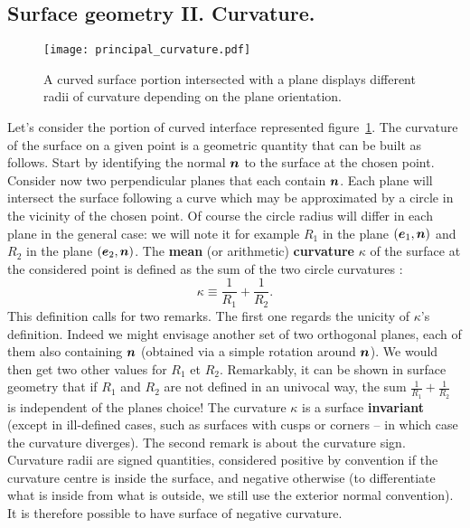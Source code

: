 \subsection{Surface geometry II. Curvature.}
\begin{figure}[htbp]
\begin{center}
\texttt{[image: principal\_curvature.pdf]} 
\end{center}
\caption{A curved surface portion intersected with a plane displays different radii of curvature depending on the plane orientation.}
\label{fig:principal_curvature}
\end{figure}
Let's consider the portion of curved interface represented figure~\ref{fig:principal_curvature}. The curvature of the surface on a given point is a geometric quantity that can be built as follows. Start by identifying the normal $\bn$ to the surface at the chosen point. Consider now two perpendicular planes that each contain $\bn$. Each plane will intersect the surface following a curve which may be approximated by a circle in the vicinity of the chosen point. Of course the circle radius will differ in each plane in the general case: we will note it for example $R_1$ in the plane $\lp\be_1,\bn\rp$ and $R_2$ in the plane $\lp\be_2,\bn\rp$. The \textbf{mean} (or arithmetic) \textbf{curvature} $\kappa$ of the surface at the considered point is defined as the sum of the two circle curvatures :
\begin{equation}
\kappa \equiv \frac{1}{R_1} + \frac{1}{R_2}.
\end{equation}
This definition calls for two remarks. The first one regards the unicity of $\kappa$'s definition. Indeed we might envisage another set of two orthogonal planes, each of them also containing $\bn$ (obtained via a simple rotation around $\bn$). We would then get two other values for $R_1$ et $R_2$. Remarkably, it can be shown in surface geometry that if $R_1$ and $R_2$ are not defined in an univocal way, the sum $\frac{1}{R_1} + \frac{1}{R_2}$ is independent of the planes choice! The curvature $\kappa$ is a surface \textbf{invariant} (except in ill-defined cases, such as surfaces with cusps or corners -- in which case the curvature diverges). The second remark is about the curvature sign. Curvature radii are signed quantities, considered positive by convention if the curvature centre is inside the surface, and negative otherwise (to differentiate what is inside from what is outside, we still use the exterior normal convention). It is therefore possible to have surface of negative curvature.

